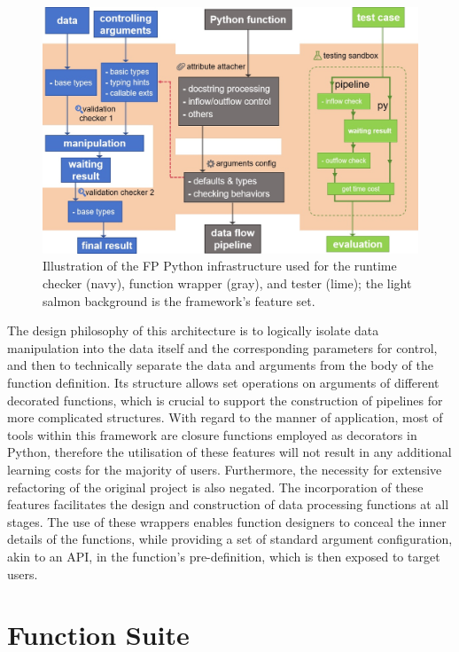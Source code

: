 \documentclass[a4paper,12pt]{article}
\begin{document}
\begin{figure}[htbp]
  \centering
  \includegraphics[scale=0.55]{frame.jpg}
  \caption{Illustration of the FP Python infrastructure used for the runtime checker (navy), function wrapper (gray), and tester (lime); the light salmon background is the framework's feature set.}
  \label{tag3}
\end{figure}

The design philosophy of this architecture is to logically isolate data manipulation into the data itself and the corresponding parameters for control, and then to technically separate the data and arguments from the body of the function definition. Its structure allows set operations on arguments of different decorated functions, which is crucial to support the construction of pipelines for more complicated structures. With regard to the manner of application, most of tools within this framework are closure functions employed as decorators in Python, therefore the utilisation of these features will not result in any additional learning costs for the majority of users. Furthermore, the necessity for extensive refactoring of the original project is also negated. The incorporation of these features facilitates the design and construction of data processing functions at all stages. The use of these wrappers enables function designers to conceal the inner details of the functions, while providing a set of standard argument configuration, akin to an API, in the function's pre-definition, which is then exposed to target users.\par

\section*{Function Suite}
\end{document}
